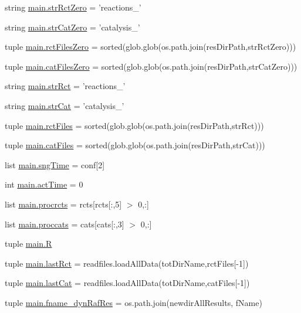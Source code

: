 \begin{DoxyCompactItemize}
\item 
string \hyperlink{a00122_adbfa32333003aa707723362b43bc11ff}{main.\-str\-Rct\-Zero} = 'reactions\-\_\-'
\item 
string \hyperlink{a00122_a6bb1e2c0e0d0a9e63313c082ee4eec76}{main.\-str\-Cat\-Zero} = 'catalysis\-\_\-'
\item 
tuple \hyperlink{a00122_aa37eddd86a00bf98dff8cc9260d6d13b}{main.\-rct\-Files\-Zero} = sorted(glob.\-glob(os.\-path.\-join(res\-Dir\-Path,str\-Rct\-Zero)))
\item 
tuple \hyperlink{a00122_a7ab6089d577bd60acf22b92e84930523}{main.\-cat\-Files\-Zero} = sorted(glob.\-glob(os.\-path.\-join(res\-Dir\-Path,str\-Cat\-Zero)))
\item 
string \hyperlink{a00122_a28a37e653a4c0984df32f8d83c3596ff}{main.\-str\-Rct} = 'reactions\-\_\-'
\item 
string \hyperlink{a00122_ab12df661b7defb4d7077777ad7d6352d}{main.\-str\-Cat} = 'catalysis\-\_\-'
\item 
tuple \hyperlink{a00122_a9016a8f5eafe76e4e8dbb1bc3ce94af5}{main.\-rct\-Files} = sorted(glob.\-glob(os.\-path.\-join(res\-Dir\-Path,str\-Rct)))
\item 
tuple \hyperlink{a00122_a189dc9cf606d870dacab059d5e7dca24}{main.\-cat\-Files} = sorted(glob.\-glob(os.\-path.\-join(res\-Dir\-Path,str\-Cat)))
\item 
list \hyperlink{a00122_ab4296f1ae2e4c4bb597ca27e84849510}{main.\-sng\-Time} = conf\mbox{[}2\mbox{]}
\item 
int \hyperlink{a00122_a9c2013c88f8354ccf6504c51843f1d5e}{main.\-act\-Time} = 0
\item 
list \hyperlink{a00122_a2120e8355b3501aed0114a74091d56c1}{main.\-procrcts} = rcts\mbox{[}rcts\mbox{[}\-:,5\mbox{]} $>$ 0,\-:\mbox{]}
\item 
list \hyperlink{a00122_a4e3c4b627d098aef6c7905cb20683e07}{main.\-proccats} = cats\mbox{[}cats\mbox{[}\-:,3\mbox{]} $>$ 0,\-:\mbox{]}
\item 
tuple \hyperlink{a00122_a8a594014e054956af345eaa5e16bea0d}{main.\-R}
\item 
tuple \hyperlink{a00122_ad9cee9fada504bb0dab86df3a416232b}{main.\-last\-Rct} = readfiles.\-load\-All\-Data(tot\-Dir\-Name,rct\-Files\mbox{[}-\/1\mbox{]})
\item 
tuple \hyperlink{a00122_a1d69cc4251d83bb227555044baf27b86}{main.\-last\-Cat} = readfiles.\-load\-All\-Data(tot\-Dir\-Name,cat\-Files\mbox{[}-\/1\mbox{]})
\item 
tuple \hyperlink{a00122_a6a031fb0c5a0a5519fc4c3f6d7ef35d1}{main.\-fname\-\_\-dyn\-Raf\-Res} = os.\-path.\-join(newdir\-All\-Results, f\-Name)

\end{DoxyCompactItemize}
